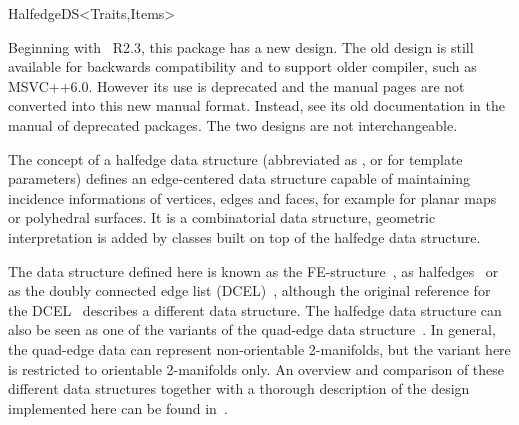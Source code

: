 
\ccRefPageBegin



\begin{ccRefConcept}{HalfedgeDS<Traits,Items>}

\ccTagFullDeclarations


Beginning with \cgal\ R2.3, this package has a new design.  The old
design is still available for backwards compatibility and to support
older compiler, such as MSVC++6.0. However its use is deprecated and
the manual pages are not converted into this new manual
format. Instead, see its old documentation in the manual of 
deprecated packages.  The two designs are not interchangeable.

\ccDefinition
  
The concept of a halfedge data structure (abbreviated as \ccRefName, or
 for template parameters) defines an edge-centered data structure
capable of maintaining incidence informations of vertices, edges and
faces, for example for planar maps or polyhedral surfaces. It is a
combinatorial data structure, geometric interpretation is added by
classes built on top of the halfedge data structure.

The data structure defined here is known as the
FE-structure~\cite{w-ebdss-85}, as
halfedges~\cite{m-ism-88,bfh-mgedm-95} or as the doubly connected edge
list (DCEL)~\cite{bkos-cgaa-97}, although the original reference for
the DCEL~\cite{mp-fitcp-78} describes a different data structure. The
halfedge data structure can also be seen as one of the variants of the
quad-edge data structure~\cite{gs-pmgsc-85}. In general, the quad-edge
data can represent non-orientable 2-manifolds, but the variant here is
restricted to orientable 2-manifolds only. An overview and comparison
of these different data structures together with a thorough
description of the design implemented here can be found
in~\cite{k-ugpdd-99}.


\end{ccRefConcept}
